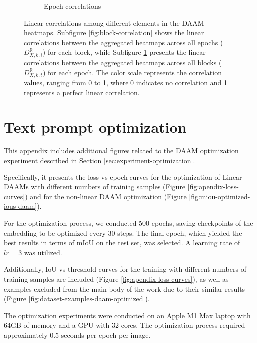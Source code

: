 \begin{figure}
\begin{subfigure}{0.545\columnwidth}
    \caption{Epoch correlations}
    \label{subfig:epoch-correlation}
\end{subfigure}
    \caption[Linear correlation analysis of block and epoch heatmaps]{Linear correlations among different elements in the DAAM heatmaps. Subfigure \ref{fig:block-correlation} shows the linear correlations between the aggregated heatmaps across all epochs ($D_{X,k, i}^{\mathbb{R}}$) for each block, while Subfigure \ref{subfig:epoch-correlation} presents the linear correlations between the aggregated heatmaps across all blocks ($D_{X,k, t}^{\mathbb{R}}$) for each epoch. The color scale represents the correlation values, ranging from 0 to 1, where 0 indicates no correlation and 1 represents a perfect linear correlation.}
    \label{fig:correlations}
\end{figure}

\chapter{Text prompt optimization}
\label{chap:appendix-text-prompt}

This appendix includes additional figures related to the DAAM optimization experiment described in Section \ref{sec:experiment-optimization}.

Specifically, it presents the loss vs epoch curves for the optimization of Linear DAAMs with different numbers of training samples (Figure \ref{fig:apendix-loss-curves}) and for the non-linear DAAM optimization (Figure \ref{fig:miou-optimized-ious-daam}).

For the optimization process, we conducted 500 epochs, saving checkpoints of the embedding to be optimized every 30 steps. The final epoch, which yielded the best results in terms of mIoU on the test set, was selected. A learning rate of $lr=3$ was utilized.

Additionally, IoU vs threshold curves for the training with different numbers of training samples are included (Figure \ref{fig:apendix-loss-curves}), as well as examples excluded from the main body of the work due to their similar results (Figure \ref{fig:dataset-examples-daam-optimized}).

The optimization experiments were conducted on an Apple M1 Max laptop with 64GB of memory and a GPU with 32 cores. The optimization process required approximately 0.5 seconds per epoch per image.

